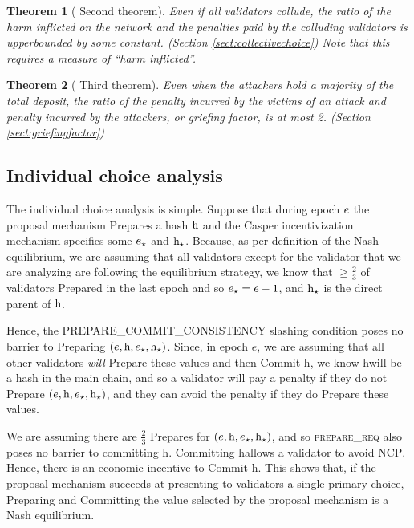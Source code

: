 \documentclass[12pt, final]{article}
\newcommand*{\todo}[1]{\color{red} #1}
\newtheorem{theorem}{Theorem}
\newcommand{\epoch}{\ensuremath{e}\space}
\newcommand{\hash}{\textnormal{h}\space}
\newcommand{\epochsource}{\ensuremath{\epoch_{\star}}\space}
\newcommand{\hashsource}{\ensuremath{\hash_{\star}}\space}
\newcommand{\NCP}{\textsc{NCP}\space}
\begin{document}
\begin{theorem}[\todo{Second theorem}]
\label{theorem2}
Even if all validators collude, the ratio of the harm inflicted on the network and the penalties paid by the colluding validators is upperbounded  by some constant. (Section \ref{sect:collectivechoice})  Note that this requires a measure of ``harm inflicted''.
\end{theorem}

\begin{theorem}[\todo{Third theorem}]
\label{theorem3}
Even when the attackers hold a majority of the total deposit, the ratio of the penalty incurred by the victims of an attack and penalty incurred by the attackers, or \emph{griefing factor}, is at most 2. (Section \ref{sect:griefingfactor})
\end{theorem}

\subsection{Individual choice analysis}
\label{sect:indivchoice}

The individual choice analysis is simple. Suppose that during epoch $\epoch$ the proposal mechanism Prepares a hash $\hash$ and the Casper incentivization mechanism specifies some $\epochsource$ and $\hashsource$. Because, as per definition of the Nash equilibrium, we are assuming that all validators except for the validator that we are analyzing are following the equilibrium strategy, we know that $\ge \frac{2}{3}$ of validators Prepared in the last epoch and so $\epochsource = \epoch - 1$, and $\hashsource$ is the direct parent of $\hash$.

Hence, the PREPARE\_COMMIT\_CONSISTENCY slashing condition poses no barrier to Preparing $(\epoch, \hash, \epochsource, \hashsource)$. Since, in epoch \epoch, we are assuming that all other validators \emph{will} Prepare these values and then Commit \hash, we know \hash will be a hash in the main chain, and so a validator will pay a penalty if they do not Prepare $(\epoch, \hash, \epochsource, \hashsource)$, and they can avoid the penalty if they do Prepare these values.

We are assuming there are $\frac{2}{3}$ Prepares for $(\epoch, \hash, \epochsource, \hashsource)$, and so \textsc{prepare\_req} also poses no barrier to committing \hash. Committing \hash allows a validator to avoid \NCP. Hence, there is an economic incentive to Commit \hash. This shows that, if the proposal mechanism succeeds at presenting to validators a single primary choice, Preparing and Committing the value selected by the proposal mechanism is a Nash equilibrium.
\end{document}
